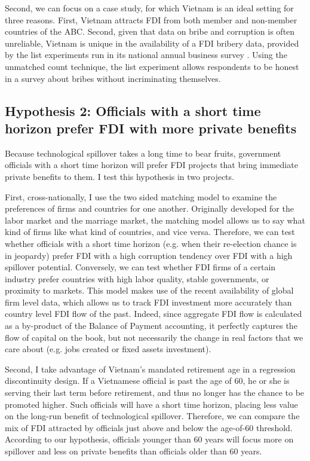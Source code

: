 \documentclass[12pt]{article}
\begin{document}
Second, we can focus on a case study, for which Vietnam is an ideal setting for
three reasons. First, Vietnam attracts
FDI from both member and non-member countries of the ABC. Second, given that
data on bribe and corruption is often unreliable, Vietnam is unique in the availability of a FDI
bribery data, provided by the list experiments run in its national annual business survey
\citep{Malesky2015}. Using the unmatched count technique, the list experiment
allows respondents to be honest in a survey
about bribes without incriminating themselves.

\subsection*{Hypothesis 2: Officials with a short time horizon prefer FDI with
  more private benefits}

Because technological spillover takes a long time to bear fruits, government
officials with a short time horizon will prefer FDI projects that bring
immediate private benefits to them. I test this hypothesis in two projects.

{\color{red}First, cross-nationally, I use the two sided matching model to examine the
preferences of firms and countries for one another. Originally developed for the
labor market and the marriage market, the matching model allows us to say
what kind of firms like what kind of countries, and vice versa. Therefore, we
can test whether officials with a short time horizon (e.g. when their
re-election chance is in jeopardy) prefer FDI with a high corruption tendency
over FDI with a high spillover potential. Conversely, we can test whether FDI firms
of a certain industry prefer countries with high labor quality, stable
governments, or proximity to markets.} This model makes use of the
recent availability of global firm level data, which allows us to track FDI
investment more accurately than country level FDI flow of the past. Indeed,
since aggregate FDI flow is calculated as a by-product of the Balance of Payment
accounting, it perfectly captures the flow of capital on the book, but not
necessarily the change in real factors that we care about (e.g. jobs created
or fixed assets investment).

Second, I take advantage of Vietnam's mandated retirement age in a regression
discontinuity design. If a Vietnamese official is past the age of 60, he or she
is serving their last term before retirement, and thus no longer has the chance
to be promoted higher. Such officials will have a short time horizon, placing
less value on the long-run benefit of technological spillover. Therefore, we can
compare the mix of FDI attracted by officials just above and below the age-of-60
threshold. According to our hypothesis, officials younger than 60 years will
focus more on spillover and less on private benefits than officials older than
60 years.

\clearpage


\end{document}
